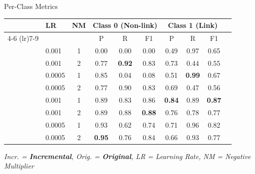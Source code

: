 \documentclass[aspectratio=169,xcolor=dvipsnames]{beamer}
\begin{document}
\begin{frame}{Per-Class Metrics }
	\begin{table}
		\centering
		\footnotesize
		\begin{tabular}{llcccccccc}
			\toprule
			 & \textbf{LR} & \textbf{NM} & \multicolumn{3}{c}{\textbf{Class 0 (Non-link)}} & \multicolumn{3}{c}{\textbf{Class 1 (Link)}}                                                                 \\
			\cmidrule(lr){4-6} \cmidrule(lr){7-9}
			 &             &             & P                                               & R                                           & F1            & P             & R             & F1            \\
			\midrule
			\multirow{4}{*}{\rotatebox{90}{\textcolor{drawblue}{\textbf{Incr.}}}}
			 & 0.001       & 1           & 0.00                                            & 0.00                                        & 0.00          & 0.49          & 0.97          & 0.65          \\
			 & 0.001       & 2           & 0.77                                            & \textbf{0.92}                               & 0.83          & 0.73          & 0.44          & 0.55          \\
			 & 0.0005      & 1           & 0.85                                            & 0.04                                        & 0.08          & 0.51          & \textbf{0.99} & 0.67          \\
			 & 0.0005      & 2           & 0.77                                            & 0.90                                        & 0.83          & 0.69          & 0.47          & 0.56          \\
			\midrule
			\multirow{4}{*}{\rotatebox{90}{\textcolor{drawred}{\textbf{Orig.}}}}
			 & 0.001       & 1           & 0.89                                            & 0.83                                        & 0.86          & \textbf{0.84} & 0.89          & \textbf{0.87} \\
			 & 0.001       & 2           & 0.89                                            & 0.88                                        & \textbf{0.88} & 0.76          & 0.78          & 0.77          \\
			 & 0.0005      & 1           & 0.93                                            & 0.62                                        & 0.74          & 0.71          & 0.96          & 0.82          \\
			 & 0.0005      & 2           & \textbf{0.95}                                   & 0.76                                        & 0.84          & 0.66          & 0.93          & 0.77          \\
			\bottomrule
		\end{tabular}
	\end{table}
	\textit{Incr. = \textcolor{drawblue}{\textbf{Incremental}}, Orig. = \textcolor{drawred}{\textbf{Original}}, LR = Learning Rate, NM = Negative Multiplier}

\end{frame}
\end{document}
